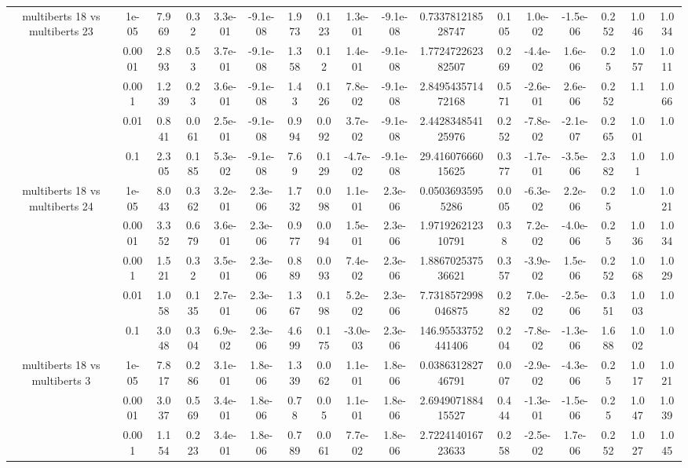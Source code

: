 \begin{tabular}{|c|c|c|c|c|c|c|c|c|c|c|c|c|c|c|c|c|}
\hline
\multirow{5}{*}{multiberts 18 vs multiberts 23} & 1e-05 & 7.969 & 0.32 & 3.3e-01 & -9.1e-08 & 1.973 & 0.123 & 1.3e-01 & -9.1e-08 & 0.733781218528747 & 0.105 & 1.0e-02 & -1.5e-06 & 0.252 & 1.046 & 1.034 \\
 & 0.0001 & 2.893 & 0.53 & 3.7e-01 & -9.1e-08 & 1.358 & 0.12 & 1.4e-01 & -9.1e-08 & 1.772472262382507 & 0.269 & -4.4e-02 & 1.6e-06 & 0.25 & 1.057 & 1.011 \\
 & 0.001 & 1.239 & 0.23 & 3.6e-01 & -9.1e-08 & 1.43 & 0.126 & 7.8e-02 & -9.1e-08 & 2.849543571472168 & 0.571 & -2.6e-01 & 2.6e-06 & 0.252 & 1.1 & 1.066 \\
 & 0.01 & 0.841 & 0.061 & 2.5e-01 & -9.1e-08 & 0.994 & 0.092 & 3.7e-02 & -9.1e-08 & 2.442834854125976 & 0.252 & -7.8e-02 & -2.1e-07 & 0.265 & 1.001 & 1.0 \\
 & 0.1 & 2.305 & 0.185 & 5.3e-02 & -9.1e-08 & 7.69 & 0.129 & -4.7e-02 & -9.1e-08 & 29.41607666015625 & 0.377 & -1.7e-01 & -3.5e-06 & 2.382 & 1.01 & 1.0 \\
\hline
\multirow{5}{*}{multiberts 18 vs multiberts 24} & 1e-05 & 8.043 & 0.362 & 3.2e-01 & 2.3e-06 & 1.732 & 0.098 & 1.1e-01 & 2.3e-06 & 0.05036935955286 & 0.005 & -6.3e-02 & 2.2e-06 & 0.25 & 1.0 & 1.021 \\
 & 0.0001 & 3.352 & 0.679 & 3.6e-01 & 2.3e-06 & 0.977 & 0.094 & 1.5e-01 & 2.3e-06 & 1.971926212310791 & 0.38 & 7.2e-02 & -4.0e-06 & 0.25 & 1.036 & 1.034 \\
 & 0.001 & 1.521 & 0.32 & 3.5e-01 & 2.3e-06 & 0.889 & 0.093 & 7.4e-02 & 2.3e-06 & 1.886702537536621 & 0.357 & -3.9e-02 & 1.5e-06 & 0.252 & 1.068 & 1.029 \\
 & 0.01 & 1.058 & 0.135 & 2.7e-01 & 2.3e-06 & 1.367 & 0.198 & 5.2e-02 & 2.3e-06 & 7.7318572998046875 & 0.282 & 7.0e-02 & -2.5e-06 & 0.351 & 1.003 & 1.0 \\
 & 0.1 & 3.048 & 0.304 & 6.9e-02 & 2.3e-06 & 4.699 & 0.175 & -3.0e-03 & 2.3e-06 & 146.95533752441406 & 0.204 & -7.8e-02 & -1.3e-06 & 1.688 & 1.002 & 1.0 \\
\hline
\multirow{5}{*}{multiberts 18 vs multiberts 3} & 1e-05 & 7.817 & 0.286 & 3.1e-01 & 1.8e-06 & 1.339 & 0.062 & 1.1e-01 & 1.8e-06 & 0.038631282746791 & 0.007 & -2.9e-02 & -4.3e-06 & 0.25 & 1.017 & 1.021 \\
 & 0.0001 & 3.037 & 0.569 & 3.4e-01 & 1.8e-06 & 0.78 & 0.05 & 1.1e-01 & 1.8e-06 & 2.694907188415527 & 0.444 & -1.3e-01 & -1.5e-06 & 0.25 & 1.047 & 1.039 \\
 & 0.001 & 1.154 & 0.223 & 3.4e-01 & 1.8e-06 & 0.789 & 0.061 & 7.7e-02 & 1.8e-06 & 2.722414016723633 & 0.258 & -2.5e-02 & 1.7e-06 & 0.252 & 1.027 & 1.045 \\

\end{tabular}
